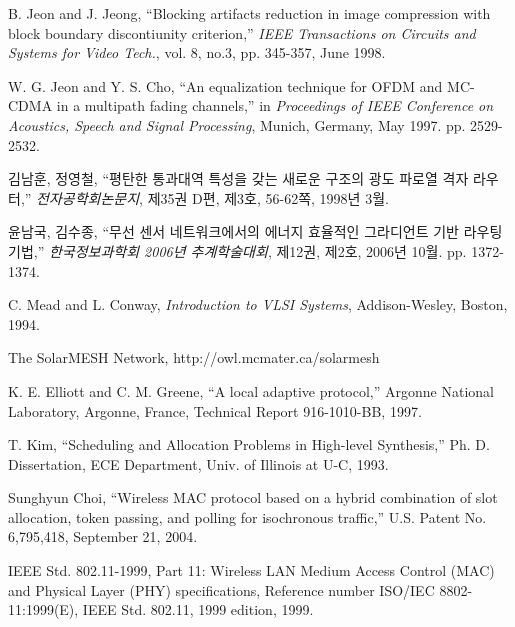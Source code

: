 \documentclass[doctor]{snuee}
\begin{document}
%
%

%

\begin{thebibliography}{00}
	
	 B. Jeon and J. Jeong, ``Blocking artifacts
	reduction in image compression with block boundary discontiunity
	criterion,'' {\em IEEE Transactions on Circuits and Systems for
		Video Tech.}, vol. 8, no.3, pp. 345-357, June 1998.
	
	 W. G. Jeon and Y. S. Cho, ``An equalization
	technique for OFDM and MC-CDMA in a multipath fading channels,''
	in {\em Proceedings of IEEE Conference on Acoustics, Speech and
		Signal Processing}, Munich, Germany, May 1997. pp. 2529-2532.
	
	 김남훈, 정영철, ``평탄한 통과대역 특성을 갖는
	새로운 구조의 광도 파로열 격자 라우터,'' {\em 전자공학회논문지},
	제35권 D편, 제3호, 56-62쪽, 1998년 3월.
	
	 윤남국, 김수종, ``무선 센서 네트워크에서의 에너지
	효율적인 그라디언트 기반 라우팅 기법,'' {\em 한국정보과학회
		2006년 추계학술대회}, 제12권, 제2호, 2006년 10월. pp.
	1372-1374.
	
	 C. Mead and L. Conway, {\em Introduction to VLSI
		Systems}, Addison-Wesley, Boston, 1994.
	
	 The SolarMESH Network,
	http://owl.mcmater.ca/solarmesh
	
	 K. E. Elliott and C. M. Greene, ``A local adaptive
	protocol,'' Argonne National Laboratory, Argonne, France,
	Technical Report 916-1010-BB, 1997.
	
	 T. Kim, ``Scheduling and Allocation Problems in
	High-level Synthesis,'' Ph. D. Dissertation, ECE Department,
	Univ. of Illinois at U-C, 1993.
	
	 Sunghyun Choi, ``Wireless MAC protocol based on a
	hybrid combination of slot allocation, token passing, and
	polling for isochronous traffic,'' U.S. Patent No. 6,795,418,
	September 21, 2004.
	
	 IEEE Std. 802.11-1999, Part 11: Wireless LAN
	Medium Access Control (MAC) and Physical Layer (PHY)
	specifications, Reference number ISO/IEC 8802-11:1999(E), IEEE
	Std. 802.11, 1999 edition, 1999.
	
\end{thebibliography}
\end{document}
